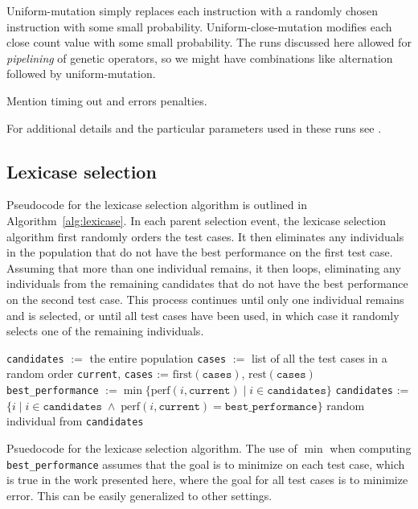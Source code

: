 Uniform-mutation simply replaces each instruction with a randomly chosen instruction with some
small probability. Uniform-close-mutation modifies each close count value with some small probability.
The runs discussed here allowed for \emph{pipelining} of genetic operators, so we might have
combinations like alternation followed by uniform-mutation.

Mention timing out and errors penalties.

For additional details and the particular parameters used in these runs see \cite{Helmuth:2015:GECCO}.

\subsection{Lexicase selection}

Pseudocode for the lexicase selection algorithm is outlined in 
Algorithm~\ref{alg:lexicase}. In each parent selection event, the lexicase selection algorithm 
first randomly orders the test cases. It then eliminates any individuals in the population 
that do not have the best performance on the first test case. 
Assuming that more than one individual remains, it then loops, eliminating any individuals from 
the remaining candidates that do not have the best performance on the second test case. This 
process continues until only one individual remains and is selected, or until all test cases 
have been used, in which case it randomly selects one of the remaining individuals.

\begin{algorithm}[tb]
	\begin{algorithmic}
		\STATE \texttt{candidates} $:=$ the entire population
		\STATE \texttt{cases} $:=$ list of all the test cases in a random order
		\STATE \texttt{current}, \texttt{cases} := $\textrm{first}(\texttt{cases})$, $\textrm{rest}(\texttt{cases})$
		\STATE \texttt{best\_performance} $:= \min \{ \textrm{perf}(i, \texttt{current}) \;|\; i \in \texttt{candidates} \}$
		\STATE \texttt{candidates} := $\{ i \;|\; i \in \texttt{candidates} \;\land\; \textrm{perf}(i, \texttt{current}) = \texttt{best\_performance}\}$
		\ENDWHILE
		\RETURN random individual from \texttt{candidates}
	\end{algorithmic}
	\caption{Psuedocode for the lexicase selection algorithm. The use of $\min$ when computing 
		\texttt{best\_performance} assumes that the goal is to minimize on each test case, which
		is true in the work presented here, where the goal for all test cases is to minimize error.
		This can be easily generalized to other settings.}
	\label{alg:lexicase}
\end{algorithm}

